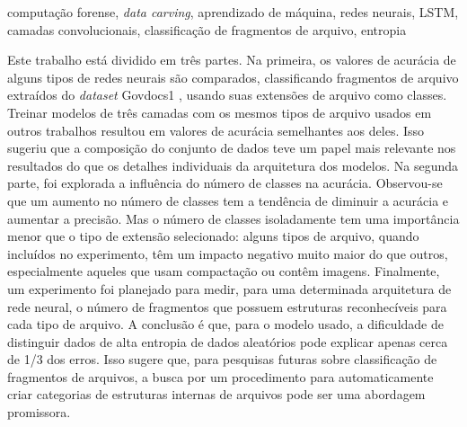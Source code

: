 \begin{resumo}{computação forense, \textit{data carving}, aprendizado de máquina, redes neurais, LSTM, camadas convolucionais, classificação de fragmentos de arquivo, entropia}

Este trabalho está dividido em três partes.
Na primeira, os valores de acurácia de alguns tipos de redes neurais são comparados, classificando fragmentos de arquivo extraídos do \textit{dataset} Govdocs1 \cite {garfinkel_bringing_2009}, usando suas extensões de arquivo como classes.
Treinar modelos de três camadas com os mesmos tipos de arquivo usados em outros trabalhos resultou em valores de acurácia semelhantes aos deles. Isso sugeriu que a composição do conjunto de dados teve um papel mais relevante nos resultados do que os detalhes individuais da arquitetura dos modelos.
Na segunda parte, foi explorada a influência do número de classes na acurácia. Observou-se que um aumento no número de classes tem a tendência de diminuir a acurácia e aumentar a precisão. Mas o número de classes isoladamente tem uma importância menor que o tipo de extensão selecionado: alguns tipos de arquivo, quando incluídos no experimento, têm um impacto negativo muito maior do que outros, especialmente aqueles que usam compactação ou contêm imagens.
Finalmente, um experimento foi planejado para medir, para uma determinada arquitetura de rede neural, o número de fragmentos que possuem estruturas reconhecíveis para cada tipo de arquivo. A conclusão é que, para o modelo usado, a dificuldade de distinguir dados de alta entropia de dados aleatórios pode explicar apenas cerca de 1/3 dos erros.
Isso sugere que, para pesquisas futuras sobre classificação de fragmentos de arquivos, a busca por um procedimento para automaticamente criar categorias de estruturas internas de arquivos pode ser uma abordagem promissora.

\end{resumo}